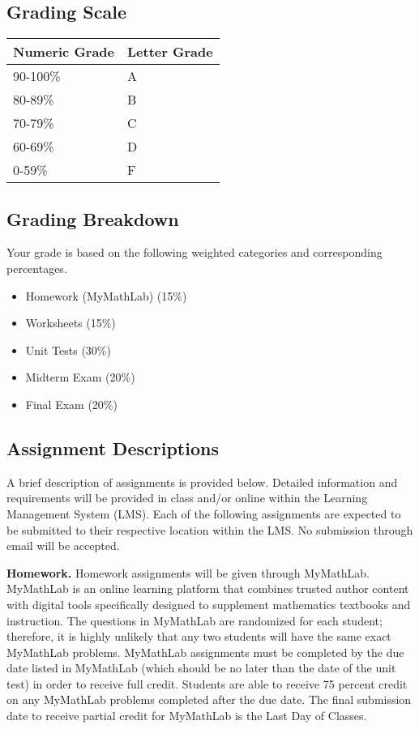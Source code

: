 \documentclass[11pt]{article}
\begin{document}
\subsection{Grading Scale}

\bigskip\noindent
\begin{tabular}{p{}p{}}
\toprule
Numeric Grade & Letter Grade \\
\hline
90-100\% & A \\
80-89\% & B \\
70-79\% & C \\
60-69\% & D \\
0-59\% & F \\
\bottomrule
\end{tabular}

\bigskip\subsection{Grading Breakdown}

Your grade is based on the following weighted categories and corresponding percentages.

\begin{itemize}
\item Homework (MyMathLab) (15\%)
\item Worksheets (15\%)
\item Unit Tests (30\%)
\item Midterm Exam (20\%)
\item Final Exam (20\%)
\end{itemize}

\subsection{Assignment Descriptions}

A brief description of assignments is provided below. Detailed information and requirements will be provided in class and/or online within the Learning Management System (LMS). Each of the following assignments are expected to be submitted to their respective location within the LMS. No submission through email will be accepted.

\textbf{Homework.} Homework assignments will be given through MyMathLab. MyMathLab is an online learning platform that combines trusted author content with digital tools specifically designed to supplement mathematics textbooks and instruction. The questions in MyMathLab are randomized for each student; therefore, it is highly unlikely that any two students will have the same exact MyMathLab problems. MyMathLab assignments must be completed by the due date listed in MyMathLab (which should be no later than the date of the unit test) in order to receive full credit. Students are able to receive 75 percent credit on any MyMathLab problems completed after the due date. The final submission date to receive partial credit for MyMathLab is the Last Day of Classes.
\end{document}
